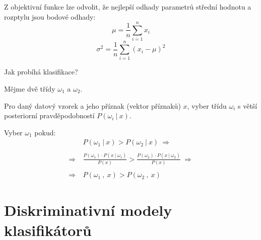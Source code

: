 \begin{compactitem}
    \item Z objektivní funkce lze odvolit, že nejlepší odhady parametrů střední hodnotu a rozptylu jsou bodové odhady:
    $$ {\displaystyle \mu = \frac{1}{n} \sum_{i=1}^n x_i } $$
    $$ {\displaystyle \sigma^2 = \frac{1}{n} \sum_{i=1}^n (x_i - \mu)^2 } $$

    \item Jak probíhá klasifikace? \begin{compactitem}
        \item Mějme dvě třídy $\omega_1$ a $\omega_2$.

        \item Pro daný datový vzorek a jeho příznak (vektor příznaků) $x$, vyber třídu $\omega_i$ s větší posteriorní pravděpodobností $P(\omega_i ~|~ x)$.

        \item Vyber $\omega_1$ pokud:
        \begin{equation}
            \begin{split}
                &P(\omega_1 ~|~ x) > P (\omega_2 ~|~ x) ~\Rightarrow~ \\
                \\
                ~\Rightarrow~ &\frac{P(\omega_1) \cdot P(x ~|~ \omega_1)}{P(x)} > \frac{P(\omega_2) \cdot P(x ~|~ \omega_2)}{P(x)} ~\Rightarrow~ \\
                \\
                ~\Rightarrow~ &P(\omega_1 ~,~ x) > P(\omega_2 ~,~ x)
            \end{split}
        \end{equation}

    \end{compactitem}

\end{compactitem}


\section{Diskriminativní modely klasifikátorů}

